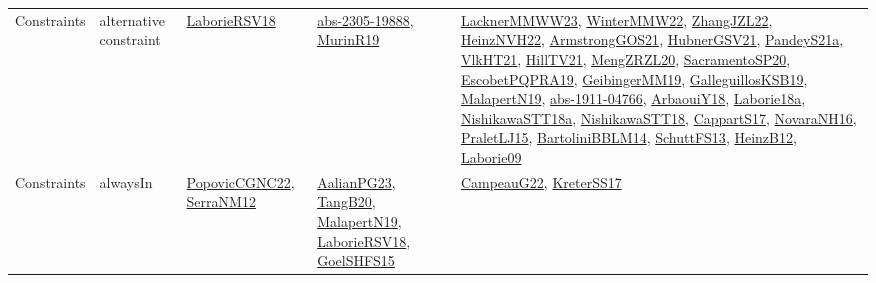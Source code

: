{\begin{longtable}{lp{3cm}>{\raggedright}p{6cm}>{\raggedright}p{6cm}p{8cm}}
Constraints & alternative constraint & \href{articles/LaborieRSV18.pdf}{LaborieRSV18}\cite{LaborieRSV18} & \href{articles/abs-2305-19888.pdf}{abs-2305-19888}\cite{abs-2305-19888}, \href{papers/MurinR19.pdf}{MurinR19}\cite{MurinR19} & \href{articles/LacknerMMWW23.pdf}{LacknerMMWW23}\cite{LacknerMMWW23}, \href{papers/WinterMMW22.pdf}{WinterMMW22}\cite{WinterMMW22}, \href{papers/ZhangJZL22.pdf}{ZhangJZL22}\cite{ZhangJZL22}, \href{articles/HeinzNVH22.pdf}{HeinzNVH22}\cite{HeinzNVH22}, \href{papers/ArmstrongGOS21.pdf}{ArmstrongGOS21}\cite{ArmstrongGOS21}, \href{articles/HubnerGSV21.pdf}{HubnerGSV21}\cite{HubnerGSV21}, \href{articles/PandeyS21a.pdf}{PandeyS21a}\cite{PandeyS21a}, \href{articles/VlkHT21.pdf}{VlkHT21}\cite{VlkHT21}, \href{papers/HillTV21.pdf}{HillTV21}\cite{HillTV21}, \href{articles/MengZRZL20.pdf}{MengZRZL20}\cite{MengZRZL20}, \href{articles/SacramentoSP20.pdf}{SacramentoSP20}\cite{SacramentoSP20}, \href{articles/EscobetPQPRA19.pdf}{EscobetPQPRA19}\cite{EscobetPQPRA19}, \href{papers/GeibingerMM19.pdf}{GeibingerMM19}\cite{GeibingerMM19}, \href{papers/GalleguillosKSB19.pdf}{GalleguillosKSB19}\cite{GalleguillosKSB19}, \href{papers/MalapertN19.pdf}{MalapertN19}\cite{MalapertN19}, \href{articles/abs-1911-04766.pdf}{abs-1911-04766}\cite{abs-1911-04766}, \href{papers/ArbaouiY18.pdf}{ArbaouiY18}\cite{ArbaouiY18}, \href{papers/Laborie18a.pdf}{Laborie18a}\cite{Laborie18a}, \href{papers/NishikawaSTT18a.pdf}{NishikawaSTT18a}\cite{NishikawaSTT18a}, \href{papers/NishikawaSTT18.pdf}{NishikawaSTT18}\cite{NishikawaSTT18}, \href{papers/CappartS17.pdf}{CappartS17}\cite{CappartS17}, \href{articles/NovaraNH16.pdf}{NovaraNH16}\cite{NovaraNH16}, \href{papers/PraletLJ15.pdf}{PraletLJ15}\cite{PraletLJ15}, \href{papers/BartoliniBBLM14.pdf}{BartoliniBBLM14}\cite{BartoliniBBLM14}, \href{papers/SchuttFS13.pdf}{SchuttFS13}\cite{SchuttFS13}, \href{papers/HeinzB12.pdf}{HeinzB12}\cite{HeinzB12}, \href{papers/Laborie09.pdf}{Laborie09}\cite{Laborie09}\\
Constraints & alwaysIn & \href{papers/PopovicCGNC22.pdf}{PopovicCGNC22}\cite{PopovicCGNC22}, \href{papers/SerraNM12.pdf}{SerraNM12}\cite{SerraNM12} & \href{papers/AalianPG23.pdf}{AalianPG23}\cite{AalianPG23}, \href{papers/TangB20.pdf}{TangB20}\cite{TangB20}, \href{papers/MalapertN19.pdf}{MalapertN19}\cite{MalapertN19}, \href{articles/LaborieRSV18.pdf}{LaborieRSV18}\cite{LaborieRSV18}, \href{articles/GoelSHFS15.pdf}{GoelSHFS15}\cite{GoelSHFS15} & \href{articles/CampeauG22.pdf}{CampeauG22}\cite{CampeauG22}, \href{articles/KreterSS17.pdf}{KreterSS17}\cite{KreterSS17}\\

\end{longtable}}
